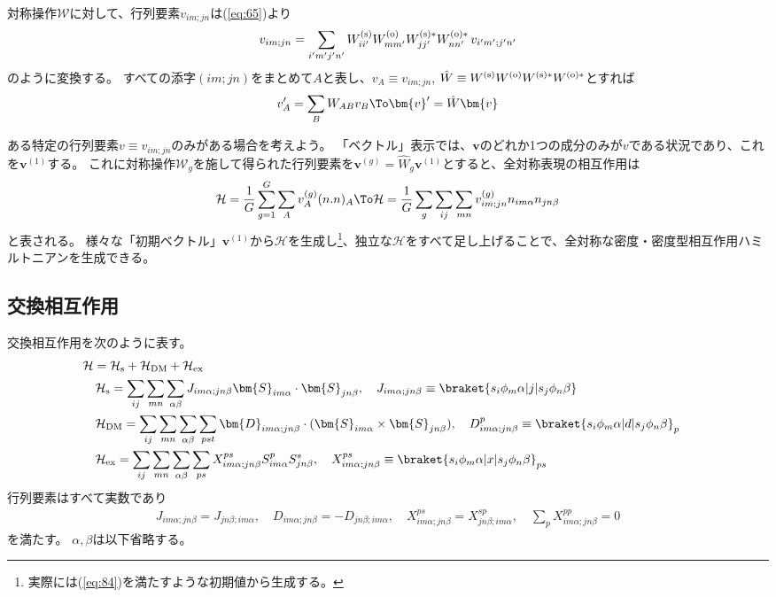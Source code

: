 \documentclass[11pt]{easymemo}
\begin{document}
対称操作$\mathcal{W}$に対して、行列要素$v_{im;jn}$は(\ref{eq:65})より
\begin{align}
v_{im;jn}=\sum_{i'm'j'n'}
W_{ii'}^{\rm (s)}W_{mm'}^{\rm (o)}W_{jj'}^{\rm (s)*}W_{nn'}^{\rm (o)*}\,v_{i'm';j'n'}
\end{align}
のように変換する。
すべての添字$(im;jn)$をまとめて$A$と表し、$v_{A}\equiv v_{im;jn}$, $\hat{W}\equiv W^{\rm (s)}W^{\rm (o)}W^{\rm (s)*}W^{\rm (o)*}$とすれば
\begin{align}
v_{A}'=\sum_{B}W_{AB}v_{B}
\To
\bm{v}'=\hat{W}\bm{v}
\end{align}

ある特定の行列要素$v\equiv v_{im;jn}$のみがある場合を考えよう。
「ベクトル」表示では、$\bm{v}$のどれか1つの成分のみが$v$である状況であり、これを$\bm{v}^{(1)}$する。
これに対称操作$\mathcal{W}_{g}$を施して得られた行列要素を$\bm{v}^{(g)}=\hat{W}_{g}\bm{v}^{(1)}$とすると、全対称表現の相互作用は
\begin{align}
\mathcal{H}=\frac{1}{G}\sum_{g=1}^{G}\sum_{A}v_{A}^{(g)}(n.n)_{A}
\To
\mathcal{H}=\frac{1}{G}\sum_{g}\sum_{ij}\sum_{mn}v_{im;jn}^{(g)}n_{im\alpha}n_{jn\beta}
\end{align}
と表される。
様々な「初期ベクトル」$\bm{v}^{(1)}$から$\mathcal{H}$を生成し\footnote{実際には(\ref{eq:84})を満たすような初期値から生成する。}、独立な$\mathcal{H}$をすべて足し上げることで、全対称な密度・密度型相互作用ハミルトニアンを生成できる。


\subsection{交換相互作用}

交換相互作用を次のように表す。
\begin{align}
&
\mathcal{H}=\mathcal{H}_{\rm s}+\mathcal{H}_{\rm DM}+\mathcal{H}_{\rm ex}
\cr&\quad
\mathcal{H}_{\rm s}=\sum_{ij}\sum_{mn}\sum_{\alpha\beta}
J_{im\alpha;jn\beta}\bm{S}_{im\alpha}\cdot\bm{S}_{jn\beta},
\quad
J_{im\alpha;jn\beta}\equiv \braket{s_{i}\phi_{m}\alpha|j|s_{j}\phi_{n}\beta}
\cr&\quad
\mathcal{H}_{\rm DM}=\sum_{ij}\sum_{mn}\sum_{\alpha\beta}\sum_{pst}
\bm{D}_{im\alpha;jn\beta}\cdot(\bm{S}_{im\alpha}\times \bm{S}_{jn\beta}),
\quad
D_{im\alpha;jn\beta}^{p}\equiv \braket{s_{i}\phi_{m}\alpha|d|s_{j}\phi_{n}\beta}_{p}
\cr&\quad
\mathcal{H}_{\rm ex}=\sum_{ij}\sum_{mn}\sum_{\alpha\beta}\sum_{ps}
X_{im\alpha;jn\beta}^{ps}S_{im\alpha}^{p}S_{jn\beta}^{s},
\quad
X_{im\alpha;jn\beta}^{ps}\equiv \braket{s_{i}\phi_{m}\alpha|x|s_{j}\phi_{n}\beta}_{ps}
\end{align}
行列要素はすべて実数であり
\begin{align}
J_{im\alpha;jn\beta}=J_{jn\beta;im\alpha},
\quad
D_{im\alpha;jn\beta}=-D_{jn\beta;im\alpha},
\quad
X_{im\alpha;jn\beta}^{ps}=X_{jn\beta;im\alpha}^{sp},
\quad
\sum_{p}X_{im\alpha;jn\beta}^{pp}=0
\label{eq:89}
\end{align}
を満たす。
$\alpha,\beta$は以下省略する。
\end{document}

